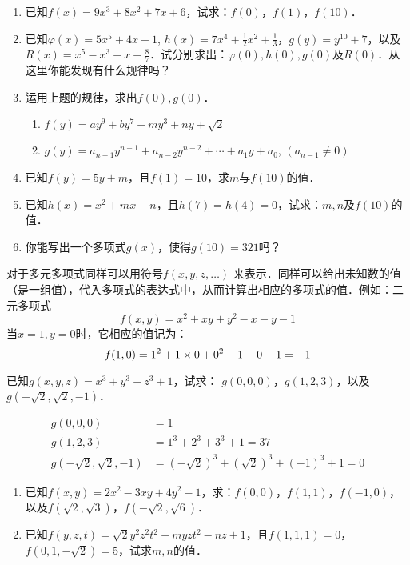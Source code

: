\begin{ex}
    \begin{enumerate}
        \item 已知$f(x)=9x^3+8x^2+7x+6$，试求：$f(0)$，$f(1)$，$f(10)$．
        \item 已知$\varphi(x)=5x^5+4x-1$, $h(x)=7x^4+\frac{1}{2}x^2+\frac{1}{3}$，$g(y)=y^{10}+7$，以及$R(x)=x^5-x^3-x+\frac{8}{7}$．试分别求出：$\varphi(0), h(0), g(0)$及$R(0)$．从这里你能发现有什么规律吗？
        \item 运用上题的规律，求出$f(0),g(0)$．
        \begin{enumerate}
            \item $f(y)=ay^9+by^7-my^3+ny+\sqrt{2}$
            \item $g(y)=a_{n-1}y^{n-1}+a_{n-2}y^{n-2}+\cdots+a_1 y+a_0$, $(a_{n-1}\ne 0)$
        \end{enumerate}
        \item 已知$f(y)=5y+m$，且$f(1)=10$，求$m$与$f(10)$的值．
        \item 已知$h(x)=x^2+mx-n$，且$h(7)=h(4)=0$，试求：$m,n$及$f(10)$的值．
        \item 你能写出一个多项式$g(x)$，使得$g(10)=321$吗？
    \end{enumerate}
\end{ex}

对于多元多项式同样可以用符号$f(x,y,z,\ldots)$
来表示．同样可以给出未知数的值（是一组值），代入多项式的表达式中，从而计算出相应的多项式的值．例如：二元多项式$$f(x,y)=x^2+xy+y^2-x-y-1  $$
当$x=1,y=0$时，它相应的值记为：
$$f (1, 0) =1^2+1\times0+0^2-1-0-1=-1$$

\begin{example}
    已知$g(x,y,z)=x^3+y^3+z^3+1$，试求：
$g(0,0,0)$，$g(1,2,3)$，以及$g\left(-\sqrt{2},\sqrt{2},-1\right)$．
\end{example}

\begin{solution}
    \[\begin{split}
        g(0,0,0)&=1\\
        g(1,2,3)&=1^3+2^3+3^3+1=37\\
        g\left(-\sqrt{2},\sqrt{2},-1\right)&=\left(-\sqrt{2}\right)^3+\left(\sqrt{2}\right)^3+(-1)^3+1=0
    \end{split}\]
\end{solution}

\begin{ex}
    \begin{enumerate}
        \item 已知$f(x,y)=2x^2-3xy+4y^2-1$，求：$f(0,0)$，$f(1,1)$，$f(-1,0)$，以及$f(\sqrt{2},\sqrt{3})$，$f(-\sqrt{2},\sqrt{6})$．
        \item 已知$f(y,z,t)=\sqrt{2}y^2z^2t^2+myzt^2-nz+1$，且$f(1,1,1)=0$，$f(0,1,-\sqrt{2})=5$，试求$m,n$的值．
    \end{enumerate}
\end{ex}

